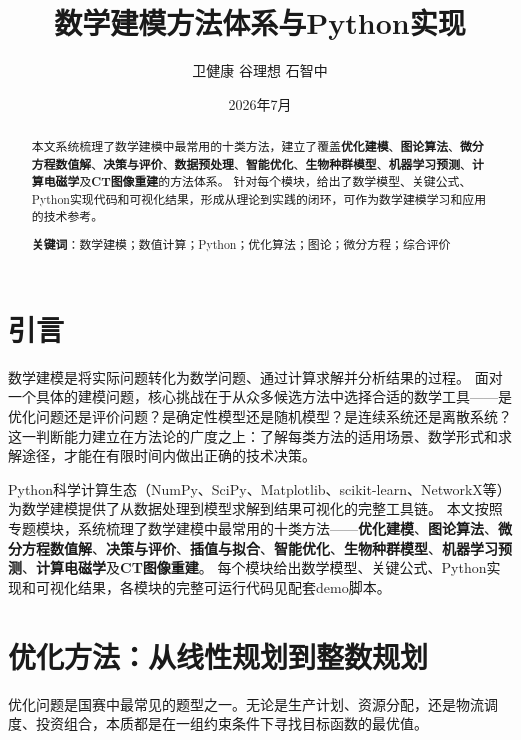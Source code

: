 \documentclass[12pt,a4paper]{ctexart}
\title{\vspace{-2cm}\textbf{数学建模方法体系与Python实现}\\[4pt]}
\author{卫健康 \quad 谷理想 \quad 石智中}
\date{2026年7月}
\begin{document}
\maketitle

\begin{abstract}
\noindent 本文系统梳理了数学建模中最常用的十类方法，建立了覆盖\textbf{优化建模}、\textbf{图论算法}、\textbf{微分方程数值解}、\textbf{决策与评价}、\textbf{数据预处理}、\textbf{智能优化}、\textbf{生物种群模型}、\textbf{机器学习预测}、\textbf{计算电磁学}及\textbf{CT图像重建}的方法体系。
针对每个模块，给出了数学模型、关键公式、Python实现代码和可视化结果，形成从理论到实践的闭环，可作为数学建模学习和应用的技术参考。

\textbf{关键词}：数学建模；数值计算；Python；优化算法；图论；微分方程；综合评价
\end{abstract}

\section{引言}

数学建模是将实际问题转化为数学问题、通过计算求解并分析结果的过程。
面对一个具体的建模问题，核心挑战在于从众多候选方法中选择合适的数学工具——是优化问题还是评价问题？是确定性模型还是随机模型？是连续系统还是离散系统？
这一判断能力建立在方法论的广度之上：了解每类方法的适用场景、数学形式和求解途径，才能在有限时间内做出正确的技术决策。

Python科学计算生态（NumPy、SciPy、Matplotlib、scikit-learn、NetworkX等）为数学建模提供了从数据处理到模型求解到结果可视化的完整工具链。
本文按照专题模块，系统梳理了数学建模中最常用的十类方法——\textbf{优化建模}、\textbf{图论算法}、\textbf{微分方程数值解}、\textbf{决策与评价}、\textbf{插值与拟合}、\textbf{智能优化}、\textbf{生物种群模型}、\textbf{机器学习预测}、\textbf{计算电磁学}及\textbf{CT图像重建}。
每个模块给出数学模型、关键公式、Python实现和可视化结果，各模块的完整可运行代码见配套demo脚本。

\section{优化方法：从线性规划到整数规划}

优化问题是国赛中最常见的题型之一。无论是生产计划、资源分配，还是物流调度、投资组合，本质都是在一组约束条件下寻找目标函数的最优值。
\end{document}
